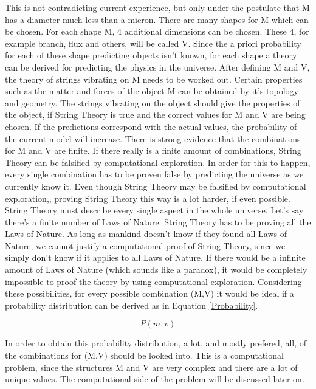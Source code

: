 \documentclass[../paper.tex]{subfiles}
\begin{document}
This is not contradicting current experience, but only under the postulate that M has a diameter much less than a micron. There are many shapes for M which can be chosen. For each shape M, 4 additional dimensions can be chosen. These 4, for example branch, flux and others,  will be called V. Since the a priori probability for each of these shape predicting objects isn't known, for each shape a theory can be derived for predicting the physics in the universe. After defining M and V, the theory of strings vibrating on M needs to be worked out. Certain properties such as the matter and forces of the object M can be obtained by it's topology and geometry. The strings vibrating on the object should give the properties of the object, if String Theory is true and the correct values for M and V are being chosen. If the predictions correspond with the actual values, the probability of the current model will increase. There is strong evidence that the combinations for M and V are finite. If there really is a finite amount of combinations, String Theory can be falsified by computational exploration. In order for this to happen, every single combination has to be proven false by predicting the universe as we currently know it. Even though String Theory may be falsified by computational exploration,, proving String Theory this way is a lot harder, if even possible. String Theory must describe every single aspect in the whole universe. Let's say there's a finite number of Laws of Nature. String Theory has to be proving all the Laws of Nature. As long as mankind doesn't know if they found all Laws of Nature, we cannot justify a computational proof of String Theory, since we simply don't know if it applies to all Laws of Nature. If there would be a infinite amount of Laws of Nature (which sounds like a paradox), it would be completely impossible to proof the theory by using computational exploration. Considering these possibilities, for every possible combination (M,V) it would be ideal if a probability distribution can be derived as in Equation \ref{Probability}.

\begin{equation}
    P(m,v)
    \label{Probability}
\end{equation}

In order to obtain this probability distribution, a lot, and mostly prefered, all, of the combinations for (M,V) should be looked into. This is a computational problem, since the structures M and V are very complex and there are a lot of unique values. The computational side of the problem will be discussed later on.
\end{document}

